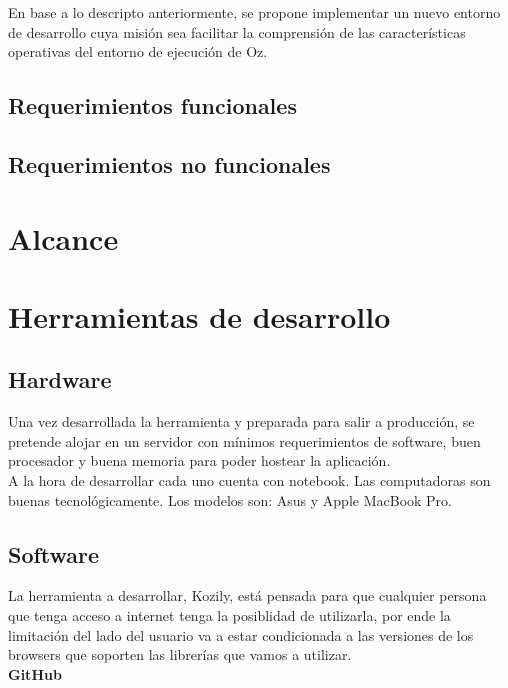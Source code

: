 \documentclass[a4paper,11pt]{article}
\begin{document}
En base a lo descripto anteriormente, se propone implementar un nuevo entorno
de desarrollo cuya misión sea facilitar la comprensión de las características
operativas del entorno de ejecución de Oz.

\subsection{Requerimientos funcionales}

\subsection{Requerimientos no funcionales}

\section{Alcance}

\section{Herramientas de desarrollo}

\subsection{Hardware}

\noindent Una vez desarrollada la herramienta y preparada para salir a
producción, se pretende alojar en un servidor con mínimos requerimientos de
software, buen procesador y buena memoria para poder hostear la aplicación.\\

\noindent A la hora de desarrollar cada uno cuenta con notebook. Las
computadoras son buenas tecnológicamente. Los modelos son: Asus y Apple MacBook
Pro.\\

\subsection{Software}

\noindent La herramienta a desarrollar, Kozily, está pensada para que cualquier
persona que tenga acceso a internet tenga la posiblidad de utilizarla, por ende
la limitación del lado del usuario va a estar condicionada a las versiones de
los browsers que soporten las librerías que vamos a utilizar.\\

\noindent \textbf{GitHub}
\end{document}
